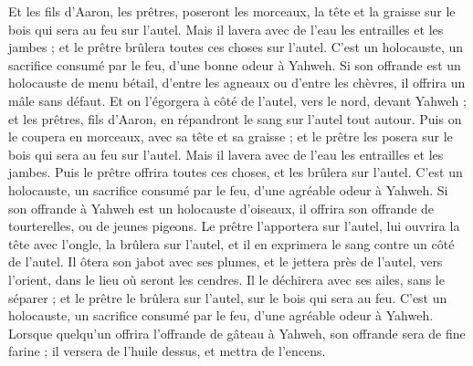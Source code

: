 \begin{multicols}{2}
Et les fils d'Aaron, les prêtres, poseront les morceaux, la tête et la graisse sur le bois qui sera au feu sur l'autel.
Mais il lavera avec de l'eau les entrailles et les jambes ; et le prêtre brûlera toutes ces choses sur l'autel. C'est un holocauste, un sacrifice consumé par le feu, d'une bonne odeur à Yahweh.
Si son offrande est un holocauste de menu bétail, d'entre les agneaux ou d'entre les chèvres, il offrira un mâle sans défaut.
Et on l'égorgera à côté de l'autel, vers le nord, devant Yahweh ; et les prêtres, fils d'Aaron, en répandront le sang sur l'autel tout autour.
Puis on le coupera en morceaux, avec sa tête et sa graisse ; et le prêtre les posera sur le bois qui sera au feu sur l'autel.
Mais il lavera avec de l'eau les entrailles et les jambes. Puis le prêtre offrira toutes ces choses, et les brûlera sur l'autel. C'est un holocauste, un sacrifice consumé par le feu, d'une agréable odeur à Yahweh.
Si son offrande à Yahweh est un holocauste d'oiseaux, il offrira son offrande de tourterelles, ou de jeunes pigeons.
Le prêtre l'apportera sur l'autel, lui ouvrira la tête avec l'ongle, la brûlera sur l'autel, et il en exprimera le sang contre un côté de l'autel.
Il ôtera son jabot avec ses plumes, et le jettera près de l'autel, vers l'orient, dans le lieu où seront les cendres.
Il le déchirera avec ses ailes, sans le séparer ; et le prêtre le brûlera sur l'autel, sur le bois qui sera au feu. C'est un holocauste, un sacrifice consumé par le feu, d'une agréable odeur à Yahweh.
\VerseOne{}Lorsque quelqu'un offrira l'offrande de gâteau à Yahweh, son offrande sera de fine farine ; il versera de l'huile dessus, et mettra de l'encens.

\end{multicols}
